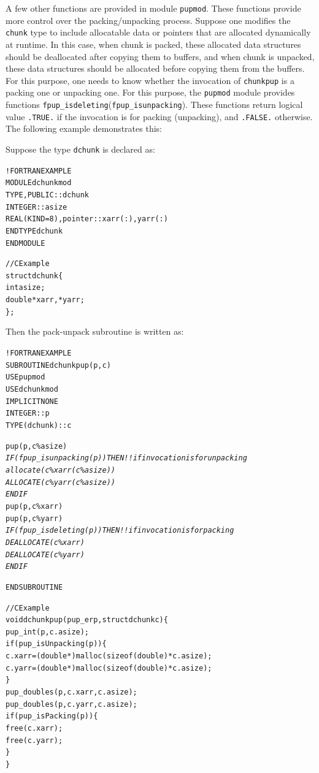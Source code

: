 \documentclass[10pt]{article}
\begin{document}
A few other functions are provided in module \texttt{pupmod}. These functions
provide more control over the packing/unpacking process. Suppose one modifies
the \texttt{chunk} type to include allocatable data or pointers that are
allocated dynamically at runtime. In this case, when chunk is packed, these
allocated data structures should be deallocated after copying them to buffers,
and when chunk is unpacked, these data structures should be allocated
before copying them from the buffers.  For this purpose, one needs to know
whether the invocation of \texttt{chunkpup} is a packing one or unpacking one.
For this purpose, the \texttt{pupmod} module provides functions
\verb+fpup_isdeleting+(\verb+fpup_isunpacking+). These functions return logical value
\verb+.TRUE.+ if the invocation is for packing (unpacking), and \verb+.FALSE.+
otherwise. The following example demonstrates this:

Suppose the type \texttt{dchunk} is declared as:

\begin{alltt}
!FORTRAN EXAMPLE
MODULE dchunkmod
  TYPE, PUBLIC :: dchunk
      INTEGER :: asize
      REAL(KIND=8), pointer :: xarr(:), yarr(:)
  END TYPE dchunk
END MODULE

//C Example
struct dchunk\{
  int asize;
  double* xarr, *yarr;
\};
\end{alltt}

Then the pack-unpack subroutine is written as:

\begin{alltt}
!FORTRAN EXAMPLE
SUBROUTINE dchunkpup(p, c)
  USE pupmod
  USE dchunkmod
  IMPLICIT NONE
  INTEGER :: p
  TYPE(dchunk) :: c

  pup(p, c\%asize)
  \emph{
  IF (fpup_isunpacking(p)) THEN       !! if invocation is for unpacking
    allocate(c\%xarr(c\%asize))
    ALLOCATE(c\%yarr(c\%asize))
  ENDIF
  }
  pup(p, c\%xarr)
  pup(p, c\%yarr)
  \emph{
  IF (fpup_isdeleting(p)) THEN        !! if invocation is for packing
    DEALLOCATE(c\%xarr)
    DEALLOCATE(c\%yarr)
  ENDIF
  }

END SUBROUTINE

//C Example
void dchunkpup(pup_er p, struct dchunk c)\{
  pup_int(p,c.asize);
  if(pup_isUnpacking(p))\{
    c.xarr = (double *)malloc(sizeof(double)*c.asize);
    c.yarr = (double *)malloc(sizeof(double)*c.asize);
  \}
  pup_doubles(p,c.xarr,c.asize);
  pup_doubles(p,c.yarr,c.asize);
  if(pup_isPacking(p))\{
    free(c.xarr);
    free(c.yarr);
  \}
\}
\end{alltt}
\end{document}
